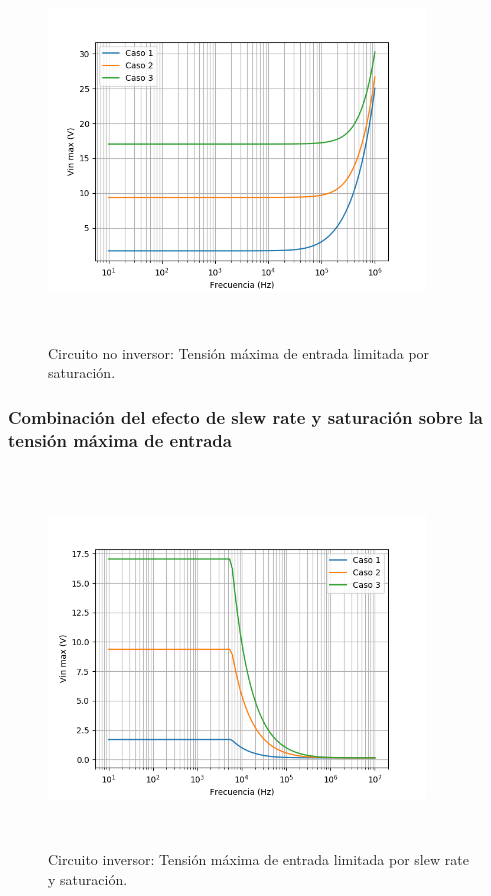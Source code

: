 \begin{figure}[H] %
	\centering
	\includegraphics[width=10cm,height=10cm,keepaspectratio]{../EJ1/00GRAFICOS/teoricos/c2sat.png}
	\caption{Circuito no inversor: Tensi\'on m\'axima de entrada limitada por saturaci\'on.}
	\label{c2sat}
\end{figure}

\subsubsection*{Combinaci\'on del efecto de slew rate y saturaci\'on sobre la tensi\'on m\'axima de entrada}

\begin{figure}[H] %
	\centering
	\includegraphics[width=10cm,height=10cm,keepaspectratio]{../EJ1/00GRAFICOS/teoricos/c1vimax.png}
	\caption{Circuito inversor: Tensi\'on m\'axima de entrada limitada por slew rate y saturaci\'on.}
	\label{c1vinmax}
\end{figure}

